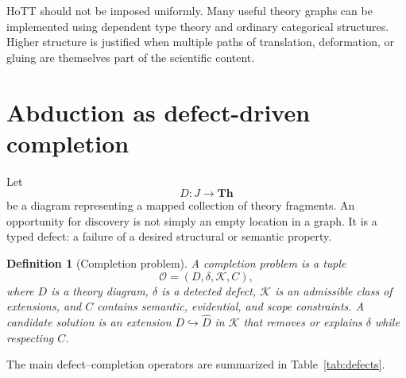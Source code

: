 \documentclass[11pt]{article}
\newtheorem{definition}{Definition}[section]
\newcommand{\Th}{\mathbf{Th}}
\begin{document}
HoTT should not be imposed uniformly. Many useful theory graphs can be implemented using dependent
type theory and ordinary categorical structures. Higher structure is justified when multiple paths of
translation, deformation, or gluing are themselves part of the scientific content.

\section{Abduction as defect-driven completion}

Let
\begin{equation}
D:J\longrightarrow\Th
\end{equation}
be a diagram representing a mapped collection of theory fragments. An opportunity for discovery is
not simply an empty location in a graph. It is a typed defect: a failure of a desired structural or
semantic property.

\begin{definition}[Completion problem]
A completion problem is a tuple
\begin{equation}
\mathcal{O}=(D,\delta,\mathcal{K},C),
\end{equation}
where $D$ is a theory diagram, $\delta$ is a detected defect, $\mathcal{K}$ is an admissible class of
extensions, and $C$ contains semantic, evidential, and scope constraints. A candidate solution is an
extension $D\hookrightarrow\widehat D$ in $\mathcal{K}$ that removes or explains $\delta$ while
respecting $C$.
\end{definition}

The main defect--completion operators are summarized in Table~\ref{tab:defects}.
\end{document}
